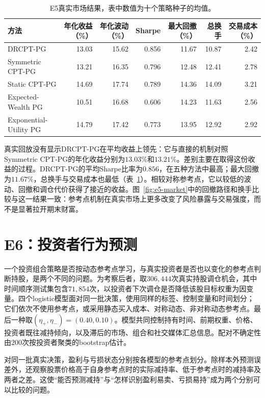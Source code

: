 \begin{table}[!htbp]
\centering
\footnotesize
\caption{E5真实市场结果，表中数值为十个策略种子的均值。}
\label{tab:e5-market}
\setlength{\tabcolsep}{3.5pt}
\begin{tabular}{lrrrrrr}
\toprule
方法 & 年化收益（\%） & 年化波动（\%） & Sharpe & 最大回撤（\%） & 总换手 & 交易成本（\%） \\
\midrule
DRCPT-PG & 13.03 & 15.62 & 0.856 & 11.67 & 10.87 & 2.42 \\
Symmetric CPT-PG & 13.21 & 16.35 & 0.796 & 12.48 & 12.41 & 2.78 \\
Static CPT-PG & 14.69 & 17.74 & 0.789 & 14.36 & 14.09 & 3.21 \\
Expected-Wealth PG & 10.51 & 16.68 & 0.606 & 14.23 & 11.63 & 2.56 \\
Exponential-Utility PG & 14.79 & 17.42 & 0.773 & 13.95 & 12.92 & 2.92 \\
\bottomrule
\end{tabular}
\end{table}

真实回放没有显示DRCPT-PG在平均收益上领先：它与直接的机制对照Symmetric CPT-PG的年化收益分别为$13.03\%$和$13.21\%$。差别主要在取得这份收益的过程。DRCPT-PG的平均Sharpe比率为$0.856$，在五种方法中最高；最大回撤为$11.67\%$，总换手与交易成本也最低（表~\ref{tab:e5-market}）。相较对称参考点，它以较低的波动、回撤和调仓代价获得了接近的收益。图~\ref{fig:e5-market}中的回撤路径和换手比较与这一结果一致：参考点机制在真实市场上更多改变了风险暴露与交易强度，而不是显著拉开期末财富。

\FloatBarrier
\section{E6：投资者行为预测}\label{sec:e6}

一个投资组合策略是否按动态参考点学习，与真实投资者是否也以变化的参考点判断持股，是两个不同的问题。为考察后者，取$306{,}444$次真实持股调仓机会，其中时间顺序测试集包含$71{,}854$次，以投资者下次调仓是否降低该股目标权重为因变量。四个logistic模型面对同一批决策，使用同样的标签、控制变量和时间划分；它们依次不使用参考点，或采用静态买入成本、对称动态、非对称动态参考点。最后一种取$(\eta_+,\eta_-)=(0.40,0.10)$。模型共同控制持有时间、前期权重、价格、投资者既往减持倾向，以及滞后的市场、组合和社交媒体汇总信息。配对不确定性由$200$次按投资者聚类的bootstrap估计。

对同一批真实决策，盈利与亏损状态分别按各模型的参考点划分。除样本外预测误差外，还观察股票价格高于自身参考点时的实际减持率、低于参考点时的减持率及两者之差。这使“能否预测减持”与“怎样识别盈利易卖、亏损易持”成为两个分别可以比较的问题。

